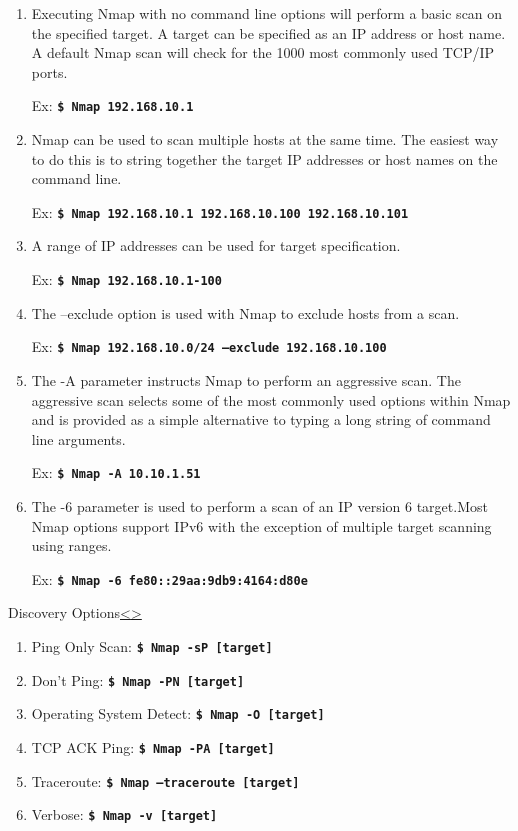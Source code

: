 \documentclass[12pt]{extarticle}
\newcommand{\code}[1]{\texttt{\bfseries#1}}
\newenvironment{instructionblock}{\Large\bgroup}{\egroup}
\begin{document}
\begin{enumerate}
	\item 
Executing Nmap with no command line options will perform a basic scan on the specified target. A target can be specified as an IP address or host name. A default Nmap scan will check for the 1000 most commonly used TCP/IP ports. \cite{cookbook} 

Ex: \code{\$ Nmap 192.168.10.1}

\item Nmap can be used to scan multiple hosts at the same time. The easiest way to do this is to string together the target IP addresses or host names on the command line.\cite{cookbook} 

Ex: \code{\$ Nmap 192.168.10.1 192.168.10.100 192.168.10.101}
 
\item A range of IP addresses can be used for target specification. \cite{cookbook} 

Ex: \code{\$ Nmap 192.168.10.1-100}

\item The --exclude option is used with Nmap to exclude hosts from a scan.\cite{cookbook} 

Ex: \code{\$ Nmap 192.168.10.0/24 --exclude 192.168.10.100}

\item The -A parameter instructs Nmap to perform an aggressive scan. The aggressive scan selects some of the most commonly used options within Nmap and is provided as a simple alternative to typing a long string of command line arguments.\cite{cookbook} 

Ex: \code{\$ Nmap -A 10.10.1.51}

\item The -6 parameter is used to perform a scan of an IP version 6 target.Most Nmap options support IPv6 with the exception of multiple target scanning using ranges. \cite{cookbook} 

Ex: \code{\$ Nmap -6 fe80::29aa:9db9:4164:d80e}
\end{enumerate}

\pagebreak
\begin{slide}{Discovery Options}{\hyperref[slide 7]{\textless}\hyperref[slide 9]{\textgreater}}
\begin{instructionblock}
\begin{enumerate}
\item Ping Only Scan: \code{\$ Nmap -sP [target]}
\item Don’t Ping: \code{\$ Nmap -PN [target]}
\item Operating System Detect: \code{\$ Nmap -O [target]}
\item TCP ACK Ping: \code{\$ Nmap -PA [target]}
\item Traceroute: \code{\$ Nmap --traceroute [target]}
\item Verbose: \code{\$ Nmap -v [target]}
\end{enumerate}
\end{instructionblock}
\end{slide}
\end{document}
